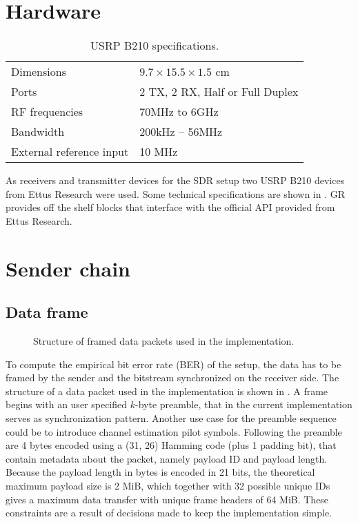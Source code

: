\section{Hardware}

\begin{table}[b]
	\centering
	\begin{tabular}{ll}
		\toprule
		Dimensions               & \(9.7 \times 15.5 \times 1.5\) cm \\
		Ports                    & 2 TX, 2 RX, Half or Full Duplex   \\
		RF frequencies           & 70MHz to 6GHz                     \\
		Bandwidth                & 200kHz -- 56MHz                   \\
		External reference input & 10 MHz                            \\
		\bottomrule
	\end{tabular}
	\caption{USRP B210 specifications.\label{tab:usrp-specs}}
\end{table}

As receivers and transmitter devices for the SDR setup two USRP B210 devices from Ettus Research were used. Some technical specifications are shown in . GR provides off the shelf blocks that interface with the official API provided from Ettus Research.

\section{Sender chain}

\subsection{Data frame} \label{sec:data-frame}

\begin{figure}
\centering

	\caption{
		Structure of framed data packets used in the implementation.
		\label{fig:dataframe}
	}
\end{figure}

To compute the empirical bit error rate (BER) of the setup, the data has to be framed by the sender and the bitstream synchronized on the receiver side. The structure of a data packet used in the implementation is shown in . A frame begins with an user specified \(k\)-byte preamble, that in the current implementation serves as synchronization pattern. Another use case for the preamble sequence could be to introduce channel estimation pilot symbols. Following the preamble are 4 bytes encoded using a (31, 26) Hamming code (plus 1 padding bit), that contain metadata about the packet, namely payload ID and payload length. Because the payload length in bytes is encoded in 21 bits, the theoretical maximum payload size is 2 MiB, which together with 32 possible unique IDs gives a maximum data transfer with unique frame headers of 64 MiB. These constraints are a result of decisions made to keep the implementation simple.


